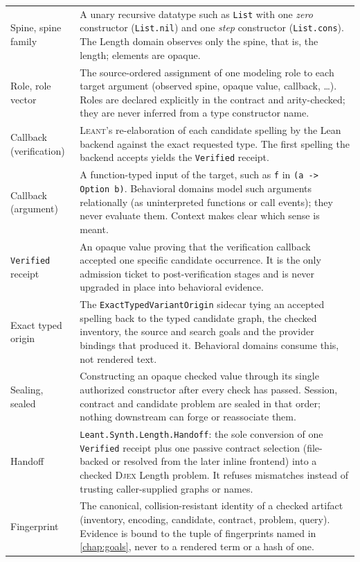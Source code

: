 \documentclass[11pt,oneside]{report}
\newcommand{\Leant}{\textsc{Leant}\xspace}
\newcommand{\Djex}{\textsc{Djex}\xspace}
\newcommand{\code}[1]{\texttt{#1}}
\begin{document}
\begin{longtable}{@{}L{0.21\textwidth}L{0.73\textwidth}@{}}
Spine, spine family & A unary recursive datatype such as \code{List} with one \emph{zero} constructor (\code{List.nil}) and one \emph{step} constructor (\code{List.cons}). The Length domain observes only the spine, that is, the length; elements are opaque. \\
Role, role vector & The source-ordered assignment of one modeling role to each target argument (observed spine, opaque value, callback, \ldots). Roles are declared explicitly in the contract and arity-checked; they are never inferred from a type constructor name. \\
Callback (verification) & \Leant's re-elaboration of each candidate spelling by the Lean backend against the exact requested type. The first spelling the backend accepts yields the \code{Verified} receipt. \\
Callback (argument) & A function-typed input of the target, such as \code{f} in \code{(a -> Option b)}. Behavioral domains model such arguments relationally (as uninterpreted functions or call events); they never evaluate them. Context makes clear which sense is meant. \\
\code{Verified} receipt & An opaque value proving that the verification callback accepted one specific candidate occurrence. It is the only admission ticket to post-verification stages and is never upgraded in place into behavioral evidence. \\
Exact typed origin & The \code{ExactTypedVariantOrigin} sidecar tying an accepted spelling back to the typed candidate graph, the checked inventory, the source and search goals and the provider bindings that produced it. Behavioral domains consume this, not rendered text. \\
Sealing, sealed & Constructing an opaque checked value through its single authorized constructor after every check has passed. Session, contract and candidate problem are sealed in that order; nothing downstream can forge or reassociate them. \\
Handoff & \code{Leant.Synth.Length.Handoff}: the sole conversion of one \code{Verified} receipt plus one passive contract selection (file-backed or resolved from the later inline frontend) into a checked \Djex Length problem. It refuses mismatches instead of trusting caller-supplied graphs or names. \\
Fingerprint & The canonical, collision-resistant identity of a checked artifact (inventory, encoding, candidate, contract, problem, query). Evidence is bound to the tuple of fingerprints named in \cref{chap:goals}, never to a rendered term or a hash of one. \\

\end{longtable}
\end{document}
